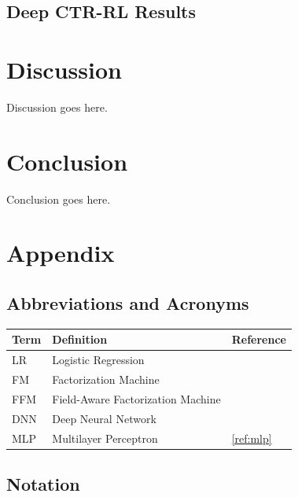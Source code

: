 \documentclass{mldsmsc}
\begin{document}
\section{Deep CTR-RL Results}

\chapter{Discussion}
\label{chap:discussion}

Discussion goes here.

\chapter{Conclusion}


Conclusion goes here. 





\clearpage
\renewcommand*{\thepage}{A\arabic{page}}

\appendix
%
\chapter{Appendix}

\section{Abbreviations and Acronyms}
\label{app:acronyms}

\begin{table}[ht]
    \begin{tabular}{|l|l|l|}
      \hline
        \textbf{Term} & \textbf{Definition} & \textbf{Reference} \\
      \hline
        LR& Logistic Regression & \\
        FM & Factorization Machine & \\
        FFM & Field-Aware Factorization Machine & \\
        DNN & Deep Neural Network & \\
        MLP & Multilayer Perceptron & \ref{ref:mlp} \\
    \hline
    \end{tabular}
\end{table}


\section{Notation}
\label{app:notation}
\end{document}
